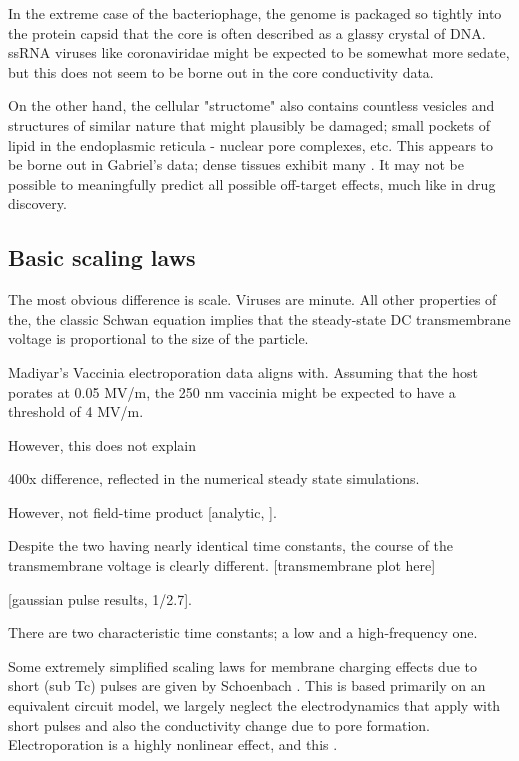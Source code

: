 \documentclass[fleqn,10pt]{paper}
\begin{document}
In the extreme case of the bacteriophage, the genome is packaged so tightly into the protein capsid that the core is often described as a glassy crystal of DNA\cite{Conformation2007}. ssRNA viruses like coronaviridae might be expected to be somewhat more sedate, but this does not seem to be borne out in the core conductivity data.

On the other hand, the cellular "structome" also contains countless vesicles and structures of similar nature that might plausibly be damaged; small pockets of lipid in the endoplasmic reticula - nuclear pore complexes, etc. This appears to be borne out in Gabriel's data; dense tissues exhibit many . It may not be possible to meaningfully predict all possible off-target effects, much like in drug discovery.



\subsection*{Basic scaling laws}

The most obvious difference is scale. Viruses are minute. All other properties of the, the classic Schwan equation implies that the steady-state DC transmembrane voltage is proportional to the size of the particle.

Madiyar's Vaccinia electroporation data aligns with. Assuming that the host porates at 0.05 MV/m, the 250 nm vaccinia might be expected to have a threshold of 4 MV/m. 

However, this does not explain 


400x difference, reflected in the numerical steady state simulations.

However, not field-time product [analytic, ]. 

Despite the two having nearly identical time constants, the course of the transmembrane voltage is clearly different.
[transmembrane plot here]

[gaussian pulse results, 1/2.7]. 


There are two characteristic time constants; a low and a high-frequency one.

Some extremely simplified scaling laws for membrane charging effects due to short (sub Tc) pulses are given by Schoenbach \cite{Bioelectric2007}. This is based primarily on an equivalent circuit model, we largely neglect the electrodynamics that apply with short pulses and also the conductivity change due to pore formation. Electroporation is a highly nonlinear effect\cite{Letter1974}, and this .
\end{document}
